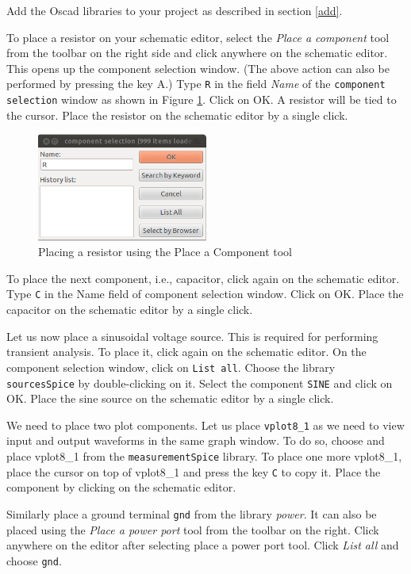 Add the Oscad libraries to your project as described in section \ref{add}.

To place a resistor on your schematic editor, select the \textit{Place a component} tool from the toolbar on the right side and click anywhere on the schematic editor. This opens up the component selection window. (The above action can also be performed by pressing the key A.) Type {\tt R} in the field \textit{Name} of the {\tt component selection} window as shown in Figure \ref{res}. Click on OK. A resistor will be tied to the cursor. Place the resistor on the schematic editor by a single click.

\begin{figure}
\centering
\includegraphics[width=0.5\textwidth]{figures/comp}
\caption{Placing a resistor using the Place a Component tool}
\label{res}
\end{figure}
To place the next component, i.e., capacitor, click again on the schematic editor. Type {\tt C} in the Name field of component selection window. Click on OK. Place the capacitor on the schematic editor by a single click.

Let us now place a sinusoidal voltage source. This is required for performing transient analysis. To place it, click again on the schematic editor. On the component selection window, click on {\tt List all}. Choose the library {\tt sourcesSpice} by double-clicking on it. Select the component {\tt SINE} and click on OK. Place the sine source on the schematic editor by a single click.

We need to place two plot components. Let us place {\tt vplot8\_1} as we need to view input and output waveforms in the same graph window. To do so, choose and place vplot8\_1 from the {\tt measurementSpice} library. To place one more vplot8\_1, place the cursor on top of vplot8\_1 and press the key {\tt C} to copy it. Place the component by clicking on the schematic editor.

Similarly place a ground terminal {\tt gnd} from the library \textit{power}. It can also be placed using the \textit{Place a power port} tool from the toolbar on the right. Click anywhere on the editor after selecting place a power port tool. Click \textit{List all} and choose {\tt gnd}.

